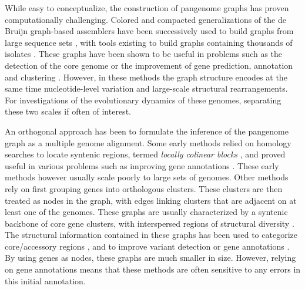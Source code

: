 \documentclass[aps,rmp,preprint,superscriptaddress,10pt,linenumbers]{revtex4-1}
\begin{document}
While easy to conceptualize, the construction of pangenome graphs has proven computationally challenging.
Colored and compacted generalizations of the de Bruijn graph-based assemblers have been successively used to build graphs from large sequence sets \cite{iqbal2012novo,muggli2017succinct}, with tools existing to build graphs containing thousands of isolates \cite{holley2020bifrost}. These graphs have been shown to be useful in problems such as the detection of the core genome \cite{schulz2022sequence} or the improvement of gene prediction, annotation and clustering \cite{horsfield2023accurate}. However, in these methods the graph structure encodes at the same time nucleotide-level variation and large-scale structural rearrangements. 
For investigations of the evolutionary dynamics of these genomes, separating these two scales if often of interest. 

An orthogonal approach has been to formulate the inference of the pangenome graph as a multiple genome alignment.
Some early methods relied on homology searches to locate syntenic regions, termed \textit{locally colinear blocks} \cite{angiuoli2011mugsy,darling2010progressivemauve}, and proved useful in various problems such as improving gene annotations \cite{angiuoli2011improving}. These early methods however usually scale poorly to large sets of genomes.
Other methods rely on first grouping genes into orthologous clusters. These clusters are then treated as nodes in the graph, with edges linking clusters that are adjacent on at least one of the genomes.
These graphs are usually characterized by a syntenic backbone of core gene clusters, with interspersed regions of structural diversity \cite{chan2015novel,oliveira2017chromosomal}.
The structural information contained in these graphs has been used to categorize core/accessory regions \cite{sutton2021pan,gautreau2020ppanggolin}, and to improve variant detection \cite{colquhoun2021pandora} or gene annotations \cite{tonkin2020producing,zhou2020accurate}. By using genes as nodes, these graphs are much smaller in size. However, relying on gene annotations means that these methods are often sensitive to any errors in this initial annotation.
\end{document}
